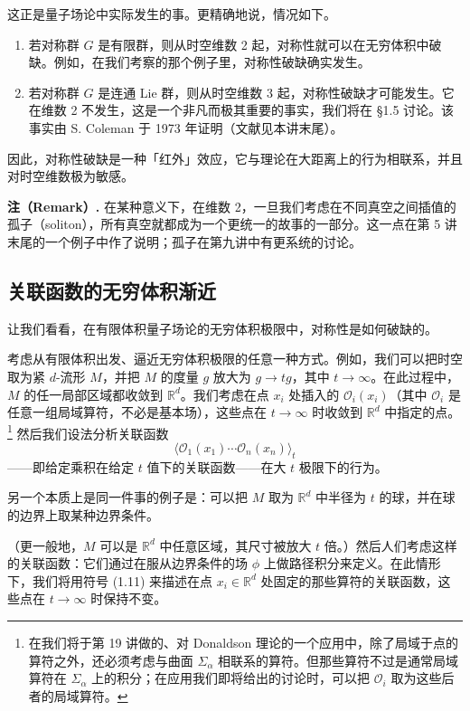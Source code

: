 这正是量子场论中实际发生的事。更精确地说，情况如下。

\begin{enumerate}
  \item[(i)] 若对称群 $G$ 是有限群，则从时空维数 2 起，对称性就可以在无穷体积中破缺。例如，在我们考察的那个例子里，对称性破缺确实发生。
  \item[(ii)] 若对称群 $G$ 是连通 Lie 群，则从时空维数 3 起，对称性破缺才可能发生。它在维数 2 不发生，这是一个非凡而极其重要的事实，我们将在 §1.5 讨论。该事实由 S. Coleman 于 1973 年证明（文献见本讲末尾）。
\end{enumerate}

因此，对称性破缺是一种「红外」效应，它与理论在大距离上的行为相联系，并且对时空维数极为敏感。

\textbf{注（Remark）.}
在某种意义下，在维数 2，一旦我们考虑在不同真空之间插值的孤子（soliton），所有真空就都成为一个更统一的故事的一部分。这一点在第 5 讲末尾的一个例子中作了说明；孤子在第九讲中有更系统的讨论。

\subsection{关联函数的无穷体积渐近}

让我们看看，在有限体积量子场论的无穷体积极限中，对称性是如何破缺的。

考虑从有限体积出发、逼近无穷体积极限的任意一种方式。例如，我们可以把时空取为紧 $d$-流形 $M$，并把 $M$ 的度量 $g$ 放大为 $g\to tg$，其中 $t\to\infty$。在此过程中，$M$ 的任一局部区域都收敛到 $\mathbb{R}^d$。我们考虑在点 $x_i$ 处插入的 $\mathcal{O}_i(x_i)$（其中 $\mathcal{O}_i$ 是任意一组局域算符，不必是基本场），这些点在 $t\to\infty$ 时收敛到 $\mathbb{R}^d$ 中指定的点。\footnote{在我们将于第 19 讲做的、对 Donaldson 理论的一个应用中，除了局域于点的算符之外，还必须考虑与曲面 $\Sigma_\alpha$ 相联系的算符。但那些算符不过是通常局域算符在 $\Sigma_\alpha$ 上的积分；在应用我们即将给出的讨论时，可以把 $\mathcal{O}_i$ 取为这些后者的局域算符。} 然后我们设法分析关联函数
\begin{equation}
  \tag{1.11}
  \label{eq:1-11}
  \langle\mathcal{O}_1(x_1)\cdots\mathcal{O}_n(x_n)\rangle_t
\end{equation}
——即给定乘积在给定 $t$ 值下的关联函数——在大 $t$ 极限下的行为。

另一个本质上是同一件事的例子是：可以把 $M$ 取为 $\mathbb{R}^d$ 中半径为 $t$ 的球，并在球的边界上取某种边界条件。

（更一般地，$M$ 可以是 $\mathbb{R}^d$ 中任意区域，其尺寸被放大 $t$ 倍。）然后人们考虑这样的关联函数：它们通过在服从边界条件的场 $\phi$ 上做路径积分来定义。在此情形下，我们将用符号 (1.11) 来描述在点 $x_i\in\mathbb{R}^d$ 处固定的那些算符的关联函数，这些点在 $t\to\infty$ 时保持不变。

